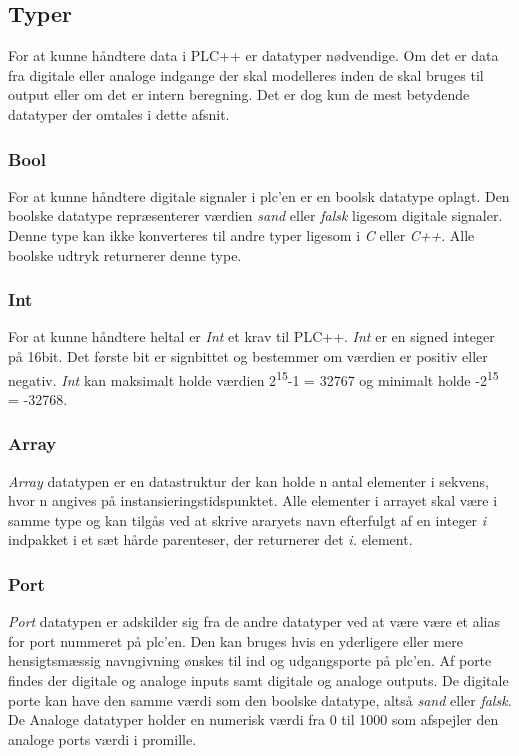 \subsection{Typer}
For at kunne håndtere data i PLC++ er datatyper nødvendige. Om det er data fra digitale eller analoge indgange der skal modelleres inden de skal bruges til output eller om det er intern beregning. Det er dog kun de mest betydende datatyper der omtales i dette afsnit.

\subsubsection*{Bool}
For at kunne håndtere digitale signaler i plc'en er en boolsk datatype oplagt. Den boolske datatype repræsenterer værdien \textit{sand} eller \textit{falsk} ligesom digitale signaler. Denne type kan ikke konverteres til andre typer ligesom i \textit{C} eller \textit{C++}. Alle boolske udtryk returnerer denne type.

\subsubsection*{Int}
For at kunne håndtere heltal er \textit{Int} et krav til PLC++. \textit{Int} er en signed integer på 16bit. Det første bit er signbittet og bestemmer om værdien er positiv eller negativ. \textit{Int} kan maksimalt holde værdien 2\textsuperscript{15}-1 = 32767 og minimalt holde -2\textsuperscript{15} = -32768.

\subsubsection*{Array}
\textit{Array} datatypen er en datastruktur der kan holde n antal elementer i sekvens, hvor n angives på instansieringstidspunktet. Alle elementer i arrayet skal være i samme type og kan tilgås ved at skrive araryets navn efterfulgt af en integer \textit{i} indpakket i et sæt hårde parenteser, der returnerer det \textit{i.} element.

\subsubsection*{Port}
\textit{Port} datatypen er adskilder sig fra de andre datatyper ved at være være et alias for port nummeret på \gls{plc}'en. Den kan bruges hvis en yderligere eller mere hensigtsmæssig navngivning ønskes til ind og udgangsporte på \gls{plc}'en.
Af porte findes der digitale og analoge inputs samt digitale og analoge outputs. De digitale porte kan have den samme værdi som den boolske datatype, altså \textit{sand} eller \textit{falsk}. De Analoge datatyper holder en numerisk værdi fra 0 til 1000 som afspejler den analoge ports værdi i promille.